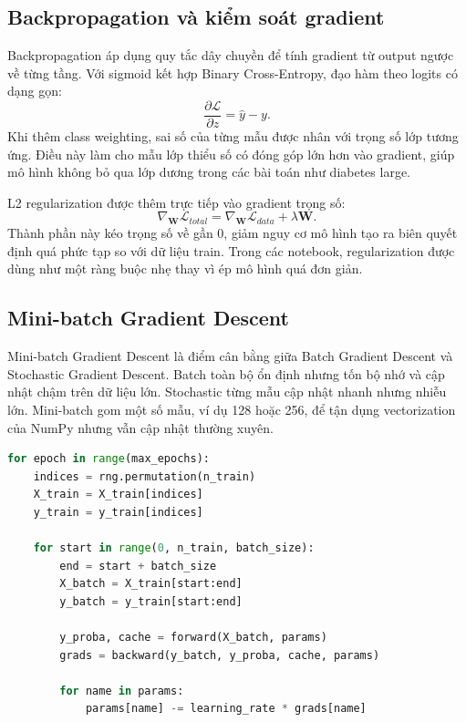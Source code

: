 \documentclass[12pt,a4paper]{report}
\begin{document}
\subsection{Backpropagation và kiểm soát gradient}
Backpropagation áp dụng quy tắc dây chuyền để tính gradient từ output ngược về từng tầng.
Với sigmoid kết hợp Binary Cross-Entropy, đạo hàm theo logits có dạng gọn:
\begin{equation}
    \frac{\partial \mathcal{L}}{\partial z} = \hat{y} - y.
\end{equation}
Khi thêm class weighting, sai số của từng mẫu được nhân với trọng số lớp tương ứng.
Điều này làm cho mẫu lớp thiểu số có đóng góp lớn hơn vào gradient, giúp mô hình không bỏ qua lớp dương trong các bài toán như diabetes large.

L2 regularization được thêm trực tiếp vào gradient trọng số:
\begin{equation}
    \nabla_{\mathbf{W}}\mathcal{L}_{total}
    =
    \nabla_{\mathbf{W}}\mathcal{L}_{data}
    +
    \lambda \mathbf{W}.
\end{equation}
Thành phần này kéo trọng số về gần 0, giảm nguy cơ mô hình tạo ra biên quyết định quá phức tạp so với dữ liệu train.
Trong các notebook, regularization được dùng như một ràng buộc nhẹ thay vì ép mô hình quá đơn giản.

\subsection{Mini-batch Gradient Descent}
Mini-batch Gradient Descent là điểm cân bằng giữa Batch Gradient Descent và Stochastic Gradient Descent.
Batch toàn bộ ổn định nhưng tốn bộ nhớ và cập nhật chậm trên dữ liệu lớn.
Stochastic từng mẫu cập nhật nhanh nhưng nhiễu lớn.
Mini-batch gom một số mẫu, ví dụ 128 hoặc 256, để tận dụng vectorization của NumPy nhưng vẫn cập nhật thường xuyên.

\begin{lstlisting}[language=Python, caption={Vòng lặp mini-batch gradient descent}, label={lst:minibatch}]
for epoch in range(max_epochs):
    indices = rng.permutation(n_train)
    X_train = X_train[indices]
    y_train = y_train[indices]

    for start in range(0, n_train, batch_size):
        end = start + batch_size
        X_batch = X_train[start:end]
        y_batch = y_train[start:end]

        y_proba, cache = forward(X_batch, params)
        grads = backward(y_batch, y_proba, cache, params)

        for name in params:
            params[name] -= learning_rate * grads[name]
\end{lstlisting}
\end{document}
